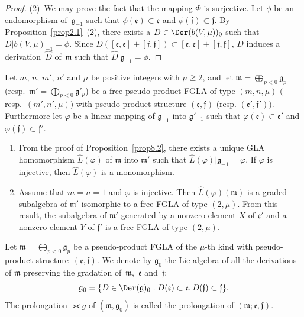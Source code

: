 \begin{proof}
(2)~We may prove the fact that the mapping $\Phi$ is surjective.
Let $\phi$ be an endomorphism of~$\mathfrak g_{-1}$ such that
$\phi(\mathfrak e)\subset \mathfrak e$ and
$\phi(\mathfrak f)\subset \mathfrak f$.
By Proposition~\ref{prop2.1}~(2), there exists a $D\in\Der(b(V,\mu))_0$
such that $D|b(V,\mu)_{-1}=\phi$.
Since $D([\mathfrak e,\mathfrak e]+[\mathfrak f,\mathfrak f])
\subset [\mathfrak e,\mathfrak e]+[\mathfrak f,\mathfrak f]$,
$D$ induces a derivation~$\hat{D}$ of~$\mathfrak m$ such that
$\hat{D}|\mathfrak g_{-1}=\phi$.
\end{proof}

\begin{remark}\label{rem8.1}
Let $m$, $n$, $m'$, $n'$ and $\mu$ be positive integers with $\mu\geqq2$, and let
$\mathfrak m=\bigoplus\limits_{p<0}\mathfrak g_p$
(resp.\ $\mathfrak m'=\bigoplus\limits_{p<0}\mathfrak g'_p$) be a
free pseudo-product FGLA of type $(m,n,\mu)$ $($resp.~$(m',n',\mu))$
with pseudo-product structure $(\mathfrak e,\mathfrak f)$
(resp. $(\mathfrak e',\mathfrak f'))$.
Furthermore
let $\varphi$ be a linear mapping of $\mathfrak g_{-1}$ into
$\mathfrak g'_{-1}$ such that $\varphi(\mathfrak e)\subset \mathfrak e'$ and
$\varphi(\mathfrak f)\subset \mathfrak f'$.
\begin{enumerate}\itemsep=0pt
\item
From the proof of Proposition~\ref{prop8.2}, there exists a unique GLA
homomorphism $\hat{L}(\varphi)$ of $\mathfrak m$ into $\mathfrak m'$
such that $\hat{L}(\varphi)|\mathfrak g_{-1}=\varphi$.
If $\varphi$ is injective, then $\hat{L}(\varphi)$ is a monomorphism.
\item
Assume that $m=n=1$ and $\varphi$ is injective.
Then $\hat{L}(\varphi)(\mathfrak m)$ is a graded subalgebra of $\mathfrak m'$
isomorphic to a free FGLA of type $(2,\mu)$.
From this result,
the subalgebra of $\mathfrak m'$ generated by a nonzero element $X$ of
$\mathfrak e'$ and a nonzero element $Y$ of $\mathfrak f'$
is a free FGLA of type $(2,\mu)$.
\end{enumerate}
\end{remark}

Let $\mathfrak m=\bigoplus\limits_{p<0}\mathfrak g_p$ be a pseudo-product FGLA
of the $\mu$-th kind with pseudo-product structure~$(\mathfrak e,\mathfrak f)$.
We denote by $\mathfrak g_0$ the Lie algebra of
all the derivations of $\mathfrak m$ preserving the gradation of~$\mathfrak m$,~$\mathfrak e$ and~$\mathfrak f$:
\[
\mathfrak g_0=\{ D\in\Der(\mathfrak g)_0:D(\mathfrak e)\subset \mathfrak e,
D(\mathfrak f)\subset \mathfrak f \}.
\]
The prolongation
$\gla g$ of $(\mathfrak m,\mathfrak g_0)$ is called the prolongation of
$(\mathfrak m;\mathfrak e,\mathfrak f)$.

